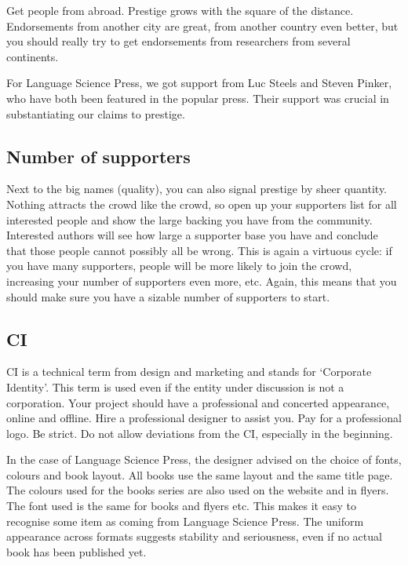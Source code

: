 \documentclass[nonflat,modfonts,output=book] {langsci/langscibook}
\begin{document}
Get people from abroad. Prestige grows with the square of the distance. Endorsements from another city are great, from another country even better, but you should really try to get endorsements from researchers from several continents. 

For Language Science Press, we got support from Luc Steels and Steven Pinker, who have both been featured in the popular press. Their support was crucial in substantiating our claims to prestige. 

\subsection{Number of supporters}
Next to the big names (quality), you can also signal prestige by sheer quantity. Nothing attracts the crowd like the crowd, so open up your supporters list for all interested people and show the large backing you have from the community. Interested authors will see how large a supporter base you have and conclude that those people cannot possibly all be wrong. This is again a virtuous cycle: if you have many supporters, people will be more likely to join the crowd, increasing your number of supporters even more, etc. Again, this means that you should make sure you have a sizable number of supporters to start. 


 
\subsection{CI}\label{sec:CI}
CI is a technical term from design and marketing and stands for `Corporate Identity'. This term is used even if the entity under discussion is not a corporation. Your project should have a professional and concerted appearance, online and offline. Hire a professional designer to assist you. Pay for a professional logo. Be strict. Do not allow deviations from the CI, especially in the beginning.

In the case of Language Science Press, the designer advised on the choice of fonts, colours and book layout. All books use the same layout and the same title page. The colours used for the books series are also used on the website and in flyers. The font used is the same for books and flyers etc. This makes it easy to recognise some item as coming from Language Science Press. The uniform appearance across formats suggests stability and seriousness, even if no actual book has been published yet. 
\end{document}
